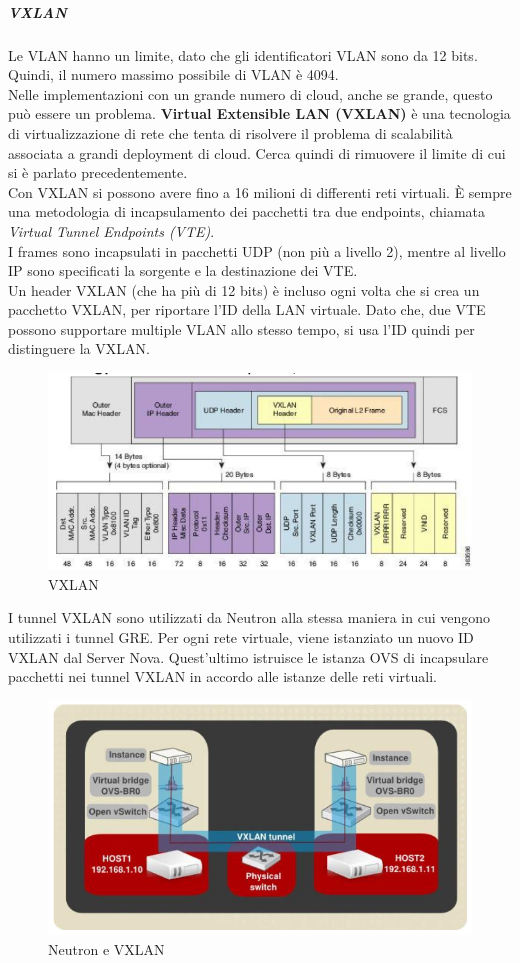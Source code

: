 \documentclass{article}
\begin{document}
\subparagraph{VXLAN}
Le VLAN hanno un limite, dato che gli identificatori VLAN sono da 12 bits. Quindi, il numero massimo possibile di VLAN è 4094. \\
Nelle implementazioni con un grande numero di cloud, anche se grande, questo può essere un problema.
\textbf{Virtual Extensible LAN (VXLAN)} è una tecnologia di virtualizzazione di rete che tenta di risolvere il problema di scalabilità associata a grandi deployment di cloud. Cerca quindi di rimuovere il limite di cui si è parlato precedentemente. \\
Con VXLAN si possono avere fino a 16 milioni di differenti reti virtuali. È sempre una metodologia di incapsulamento dei pacchetti tra due endpoints, chiamata \textit{Virtual Tunnel Endpoints (VTE)}. \\
I frames sono incapsulati in pacchetti UDP (non più a livello 2), mentre al livello IP sono specificati la sorgente e la destinazione dei VTE. \\
Un header VXLAN (che ha più di 12 bits) è incluso ogni volta che si crea un pacchetto VXLAN, per riportare l'ID della LAN virtuale. Dato che, due VTE possono supportare multiple VLAN allo stesso tempo, si usa l'ID quindi per distinguere la VXLAN.
\begin{figure}[H]
    \centering
    \includegraphics[scale=0.5]{img/VXLAN.png}
    \caption{VXLAN}
\end{figure}\noindent
I tunnel VXLAN sono utilizzati da Neutron alla stessa maniera in cui vengono utilizzati i tunnel GRE. Per ogni rete virtuale, viene istanziato un nuovo ID VXLAN dal Server Nova. Quest'ultimo istruisce le istanza OVS di incapsulare pacchetti nei tunnel VXLAN in accordo alle istanze delle reti virtuali.
\begin{figure}[H]
    \centering
    \includegraphics[scale=0.4]{img/Neutron e VXLAN.png}
    \caption{Neutron e VXLAN}
\end{figure}\noindent
\end{document}
